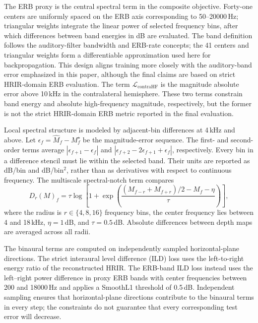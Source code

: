 \documentclass[UTF8,a4paper]{article}
\begin{document}
The ERB proxy is the central spectral term in the composite objective. Forty-one centers are uniformly spaced on the ERB axis corresponding to 50--20000\,Hz; triangular weights integrate the linear power of selected frequency bins, after which differences between band energies in dB are evaluated. The band definition follows the auditory-filter bandwidth and ERB-rate concepts\cite{R23}; the 41 centers and triangular weights form a differentiable approximation used here for backpropagation. This design aligns training more closely with the auditory-band error emphasized in this paper, although the final claims are based on strict HRIR-domain ERB evaluation. The term $\mathcal L_{\mathrm{contraHF}}$ is the magnitude absolute error above 10\,kHz in the contralateral hemisphere. These two terms constrain band energy and absolute high-frequency magnitude, respectively, but the former is not the strict HRIR-domain ERB metric reported in the final evaluation.

Local spectral structure is modeled by adjacent-bin differences at 4\,kHz and above. Let $\epsilon_f=\widehat M_f-M^\star_f$ be the magnitude-error sequence. The first- and second-order terms average $|\epsilon_{f+1}-\epsilon_f|$ and $|\epsilon_{f+2}-2\epsilon_{f+1}+\epsilon_f|$, respectively. Every bin in a difference stencil must lie within the selected band. Their units are reported as dB/bin and dB/bin$^2$, rather than as derivatives with respect to continuous frequency. The multiscale spectral-notch term compares
\begin{equation}
D_r(M)_f=\tau\log\!\left[
1+\exp\!\left(
\frac{(M_{f-r}+M_{f+r})/2-M_f-\eta}{\tau}
\right)\right],
\end{equation}
where the radius is $r\in\{4,8,16\}$ frequency bins, the center frequency lies between 4 and 18\,kHz, $\eta=1$\,dB, and $\tau=0.5$\,dB. Absolute differences between depth maps are averaged across all radii.

The binaural terms are computed on independently sampled horizontal-plane directions. The strict interaural level difference (ILD) loss uses the left-to-right energy ratio of the reconstructed HRIR. The ERB-band ILD loss instead uses the left--right power difference in proxy ERB bands with center frequencies between 200 and 18000\,Hz and applies a SmoothL1 threshold of 0.5\,dB. Independent sampling ensures that horizontal-plane directions contribute to the binaural terms in every step; the constraints do not guarantee that every corresponding test error will decrease.
\end{document}
